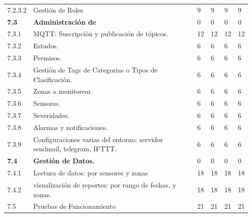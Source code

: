 \documentclass[11pt]{charter}
\begin{document}
\begin{landscape}
\begin{tabularx}{\linewidth}{@{}|p{2cm}|p{11cm}|p{2.4cm}|p{2.4cm}|p{2.4cm}|p{2.4cm}|@{}}
7.2.3.2        & Gestión de Roles                                                                              & 9    & 9    & 9    & 9    \\
\textbf{7.3}   & \textbf{Administración de}                                                                    & 0    & 0    & 0    & 0    \\
7.3.1          & MQTT: Suscripción y publicación   de tópicos.                                                 & 12   & 12   & 12   & 12   \\
7.3.2          & Estados.                                                                                      & 6    & 6    & 6    & 6    \\
7.3.3          & Permisos.                                                                                     & 6    & 6    & 6    & 6    \\
7.3.4          & Gestión de Tags de Categorias o   Tipos de Clasificación.                                     & 6    & 6    & 6    & 6    \\
7.3.5          & Zonas a monitorear.                                                                           & 6    & 6    & 6    & 6    \\
7.3.6          & Sensores.                                                                                     & 6    & 6    & 6    & 6    \\
7.3.7          & Severidades.                                                                                  & 6    & 6    & 6    & 6    \\
7.3.8          & Alarmas y notificaciones.                                                                     & 6    & 6    & 6    & 6    \\
7.3.9          & Configuraciones varias del   entorno: servidor sendmail, telegram, IFTTT.                     & 6    & 6    & 6    & 6    \\
\textbf{7.4}   & \textbf{Gestión de Datos.}                                                                    & 0    & 0    & 0    & 0    \\
7.4.1          & Lectura de datos: por sensores y   zonas                                                      & 18   & 18   & 18   & 18   \\
7.4.2          & visualización de reportes: por   rango de fechas,  y zonas.                                   & 18   & 18   & 18   & 18   \\
7.5            & Pruebas de Funcionamiento                                                                     & 21   & 21   & 21   & 21   \\

\end{tabularx}
\end{landscape}
\end{document}
